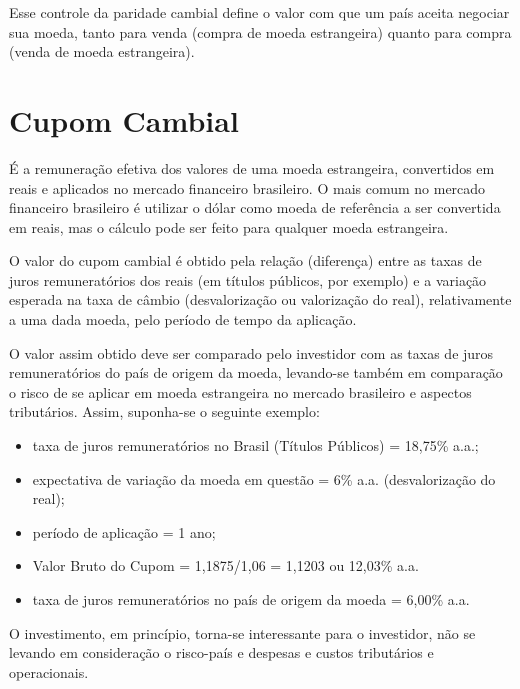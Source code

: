 \documentclass{article}\usepackage[]{graphicx}\usepackage[]{xcolor}
\begin{document}
Esse controle da paridade cambial define o valor com que um país aceita negociar sua moeda, 
tanto para venda (compra de moeda estrangeira) quanto para compra (venda de moeda estrangeira).\par

\section*{Cupom Cambial}

É a remuneração efetiva dos valores de uma moeda estrangeira, convertidos em reais e aplicados no 
mercado financeiro brasileiro. O mais comum no mercado financeiro brasileiro é utilizar o dólar como 
moeda de referência a ser convertida em reais, mas o cálculo pode ser feito para qualquer moeda estrangeira.\par

O valor do cupom cambial é obtido pela relação (diferença) entre as taxas de juros remuneratórios dos 
reais (em títulos públicos, por exemplo) e a variação esperada na taxa de câmbio (desvalorização ou 
valorização do real), relativamente a uma dada moeda, pelo período de tempo da aplicação.\par

O valor assim obtido deve ser comparado pelo investidor com as taxas de juros remuneratórios do 
país de origem da moeda, levando-se também em comparação o risco de se aplicar em moeda estrangeira 
no mercado brasileiro e aspectos tributários. Assim, suponha-se o seguinte exemplo:

\begin{itemize}

  \item taxa de juros remuneratórios no Brasil (Títulos Públicos) = 18,75\% a.a.;
  
  \item expectativa de variação da moeda em questão = 6\% a.a. (desvalorização do real);
  
  \item período de aplicação = 1 ano;
  
  \item Valor Bruto do Cupom = 1,1875/1,06 = 1,1203 ou 12,03\% a.a.
  
  \item taxa de juros remuneratórios no país de origem da moeda = 6,00\% a.a.
  
\end{itemize}

O investimento, em princípio, torna-se interessante para o investidor, não se levando em 
consideração o risco-país e despesas e custos tributários e operacionais.\par
\end{document}
